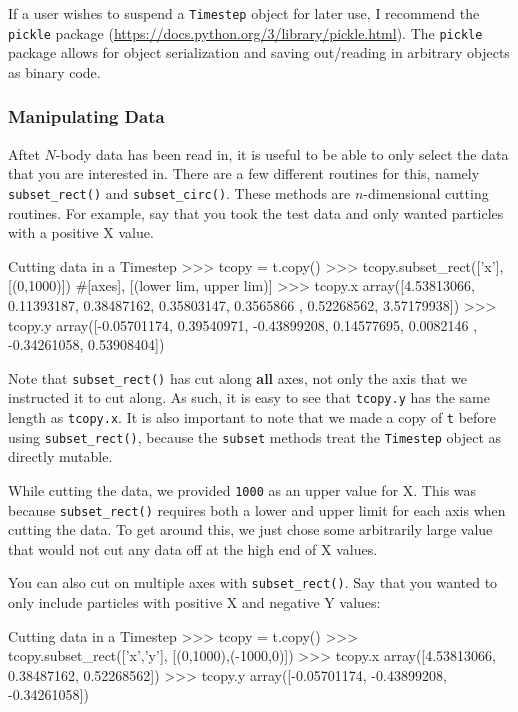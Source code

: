 \documentclass{article}
\begin{document}
If a user wishes to suspend a \verb!Timestep! object for later use, I recommend the \verb!pickle! package (\url{https://docs.python.org/3/library/pickle.html}). The \verb!pickle! package allows for object serialization and saving out/reading in arbitrary objects as binary code.

\subsubsection{Manipulating Data}

Aftet $N$-body data has been read in, it is useful to be able to only select the data that you are interested in. There are a few different routines for this, namely \verb!subset_rect()! and \verb!subset_circ()!. These methods are $n$-dimensional cutting routines. For example, say that you took the test data and only wanted particles with a positive X value. \\

\begin{codelisting}{Cutting data in a Timestep}
>>> tcopy = t.copy()
>>> tcopy.subset_rect(['x'], [(0,1000)]) #[axes], [(lower lim, upper lim)]
>>> tcopy.x
array([4.53813066, 0.11393187, 0.38487162, 0.35803147, 0.3565866 ,
       0.52268562, 3.57179938])
>>> tcopy.y
array([-0.05701174,  0.39540971, -0.43899208,  0.14577695,  0.0082146 ,
       -0.34261058,  0.53908404])
\end{codelisting}

Note that \verb!subset_rect()! has cut along \textbf{all} axes, not only the axis that we instructed it to cut along. As such, it is easy to see that \verb!tcopy.y! has the same length as \verb!tcopy.x!. It is also important to note that we made a copy of \verb!t! before using \verb!subset_rect()!, because the \verb!subset! methods treat the \verb!Timestep! object as directly mutable. 

While cutting the data, we provided \verb!1000! as an upper value for X. This was because \verb!subset_rect()! requires both a lower and upper limit for each axis when cutting the data. To get around this, we just chose some arbitrarily large value that would not cut any data off at the high end of X values. 

You can also cut on multiple axes with \verb!subset_rect()!. Say that you wanted to only include particles with positive X and negative Y values: \\

\begin{codelisting}{Cutting data in a Timestep}
>>> tcopy = t.copy()
>>> tcopy.subset_rect(['x','y'], [(0,1000),(-1000,0)])
>>> tcopy.x
array([4.53813066, 0.38487162, 0.52268562])
>>> tcopy.y
array([-0.05701174, -0.43899208, -0.34261058])
\end{codelisting}
\end{document}
